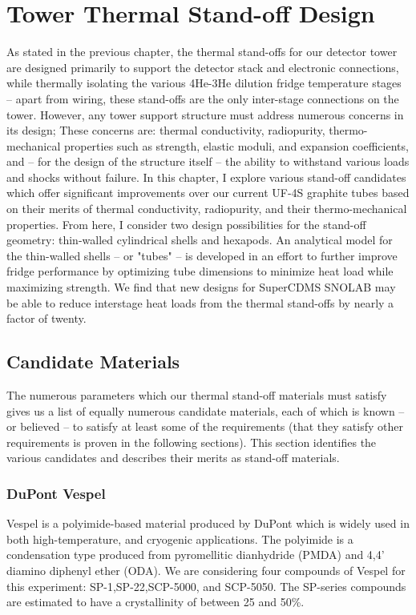 \documentclass{report}
\begin{document}
\chapter{Tower Thermal Stand-off Design}

As stated in the previous chapter, the thermal stand-offs for our detector tower are designed primarily to support the detector stack and electronic connections, while thermally isolating the various 4He-3He dilution fridge temperature stages -- apart from wiring, these stand-offs are the only inter-stage connections on the tower. However, any tower support structure must address numerous concerns in its design; These concerns are: thermal conductivity, radiopurity, thermo-mechanical properties such as strength, elastic moduli, and expansion coefficients, and -- for the design of the structure itself -- the ability to withstand various loads and shocks without failure. In this chapter, I explore various stand-off candidates which offer significant improvements over our current UF-4S graphite tubes based on their merits of thermal conductivity, radiopurity, and their thermo-mechanical properties. From here, I consider two design possibilities for the stand-off geometry: thin-walled cylindrical shells and hexapods. An analytical model for the thin-walled shells -- or "tubes" -- is developed in an effort to further improve fridge performance by optimizing tube dimensions to minimize heat load while maximizing strength. We find that new designs for SuperCDMS SNOLAB may be able to reduce interstage heat loads from the thermal stand-offs by nearly a factor of twenty.

\section{Candidate Materials}
The numerous parameters which our thermal stand-off materials must satisfy gives us a list of equally numerous candidate materials, each of which is known -- or believed -- to satisfy at least some of the requirements (that they satisfy other requirements is proven in the following sections). This section identifies the various candidates and describes their merits as stand-off materials.

\subsection{DuPont Vespel}
Vespel is a polyimide-based material produced by DuPont which is widely used in both high-temperature, and cryogenic applications. The polyimide is a condensation type produced from pyromellitic dianhydride (PMDA) and 4,4' diamino diphenyl ether (ODA)\footnotemark. We are considering four compounds of Vespel for this experiment: SP-1,SP-22,SCP-5000, and SCP-5050. The SP-series compounds are estimated to have a crystallinity of between 25 and 50\%.
\end{document}
